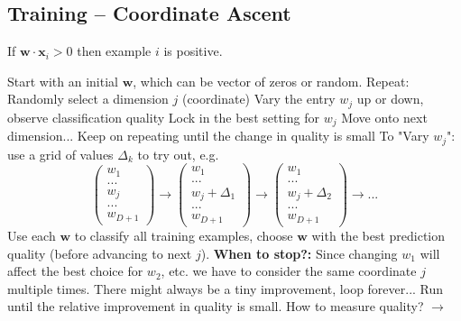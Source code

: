 \documentclass{article}
\renewcommand{\vec}[1]{%
	\mathbf{#1}%
}
\begin{document}
	\subsection{Training -- Coordinate Ascent}
	If $\vec{w} \cdot \vec{x}_i > 0$ then example $i$ is positive.
	\begin{outline}
		\1 Start with an initial $\vec{w}$, which can be vector of zeros or random.
		\1 Repeat: Randomly select a dimension $j$ (coordinate)
		\2 Vary the entry $w_j$ up or down, observe classification quality
		\2 Lock in the best setting for $w_j$
		\2 Move onto next dimension...
		\1 Keep on repeating until the change in quality is small
		\hspace{1em}
		\1 To "Vary $w_j$": use a grid of values $\Delta_k$ to try out, e.g.
		\begin{equation*}
			\begin{pmatrix}w_1\\...\\w_j\\...\\w_{D+1}\end{pmatrix}
			\rightarrow
			\begin{pmatrix}w_1\\...\\w_j + \Delta_1\\...\\w_{D+1}\end{pmatrix}
			\rightarrow
			\begin{pmatrix}w_1\\...\\w_j+\Delta_2\\...\\w_{D+1}\end{pmatrix}
			\rightarrow
			...
		\end{equation*}
		\1 Use each $\vec{w}$ to classify all training examples, choose $\vec{w}$ with the best prediction quality (before advancing to next $j$).
		\1 \textbf{When to stop?:} Since changing $w_1$ will affect the best choice for $w_2$, etc. we have to consider the same coordinate $j$ multiple times.
		\1 There might always be a tiny improvement, loop forever...
		\1 Run until the relative improvement in quality is small. How to measure quality? $\rightarrow$
	\end{outline}
\end{document}
